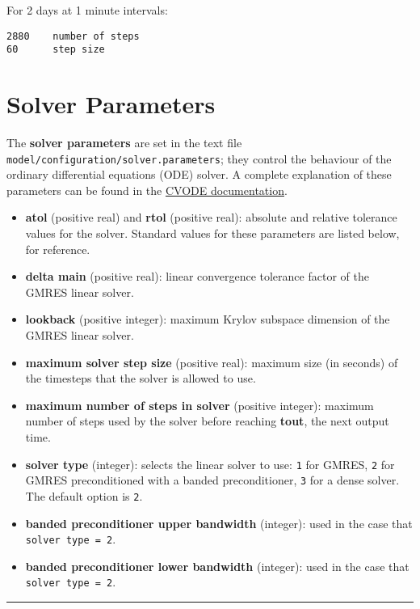 For 2 days at 1 minute intervals:

\begin{verbatim}
2880    number of steps
60      step size
\end{verbatim}

\section{Solver Parameters} \label{sec:solver}

The \textbf{solver parameters} are set in the text file
\texttt{model/configuration/solver.parameters}; they control the
behaviour of the ordinary differential equations (ODE) solver. A
complete explanation of these parameters can be found in the
\href{https://computation.llnl.gov/projects/sundials/sundials-software}{CVODE
documentation}.

\begin{itemize}
\item
  \textbf{atol} (positive real) and \textbf{rtol} (positive real):
  absolute and relative tolerance values for the solver. Standard values
  for these parameters are listed below, for reference.
\item
  \textbf{delta main} (positive real): linear convergence tolerance
  factor of the GMRES linear solver.
\item
  \textbf{lookback} (positive integer): maximum Krylov subspace
  dimension of the GMRES linear solver.
\item
  \textbf{maximum solver step size} (positive real): maximum size (in
  seconds) of the timesteps that the solver is allowed to use.
\item
  \textbf{maximum number of steps in solver} (positive integer): maximum
  number of steps used by the solver before reaching \textbf{tout}, the
  next output time.
\item
  \textbf{solver type} (integer): selects the linear solver to use:
  \texttt{1} for GMRES, \texttt{2} for GMRES preconditioned with a
  banded preconditioner, \texttt{3} for a dense solver. The default
  option is \texttt{2}.
\item
  \textbf{banded preconditioner upper bandwidth} (integer): used in the
  case that \texttt{solver\ type\ =\ 2}.
\item
  \textbf{banded preconditioner lower bandwidth} (integer): used in the
  case that \texttt{solver\ type\ =\ 2}.
\end{itemize}

\begin{center}\rule{0.5\linewidth}{\linethickness}\end{center}

